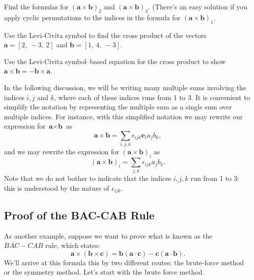 \begin{exercise}{}
Find the formulas for
$(\textbf{a} \times \textbf{b})_2$ and $(\textbf{a} \times \textbf{b})_3$.  (There's an easy solution if you apply cyclic permutations to the indices in the formula for $(\textbf{a} \times \textbf{b})_1$.
\end{exercise}

\begin{exercise}{}
Use the Levi-Civita symbol to find the cross product of the vectors $\textbf{a}=[2,~-3,~2]$ and $\textbf{b}=[1,~4,~-3]$.
\end{exercise}

\begin{exercise}{}
Use the Levi-Civita symbol--based equation for the cross product to show $\textbf{a} \times \textbf{b} = -\textbf{b} \times \textbf{a}$.
\end{exercise}   

In the following discussion, we will be writing many multiple sums involving the indices $i,j$ and $k$, where each of these indices runs from 1 to 3. It is convenient to simplify the notation by representing the multiple sum as a single sum over multiple indices. For instance, with this simplified notation we may rewrite our expression for 
$\textbf{a} \times \textbf{b}$ as
\[\textbf{a} \times \textbf{b} =  \sum_{i,j,k} \epsilon_{ijk} \textbf{e}_i  a_j b_k, \]
and we may rewrite the expression for 
$(\textbf{a} \times \textbf{b})_i$ as
\[ (\textbf{a} \times \textbf{b})_i = \sum_{j,k} \epsilon_{ijk} a_j b_k. \]
Note that we do not bother to indicate that the indices $i,j,k$ run from 1 to 3: this is understood by the nature of $\epsilon_{ijk}$.

\subsection{Proof of the BAC-CAB Rule}
As another example, suppose we want to prove what is known as the $BAC-CAB$ rule, which states:
\[ \textbf{a} \times \left( \textbf{b} \times \textbf{c} \right) = \textbf{b} \left( \textbf{a} \cdot \textbf{c} \right) - \textbf{c} \left( \textbf{a} \cdot \textbf{b} \right). \]
We'll arrive at this formula this by two different routes: the brute-force method or the symmetry method.  Let's start with the brute force method.

